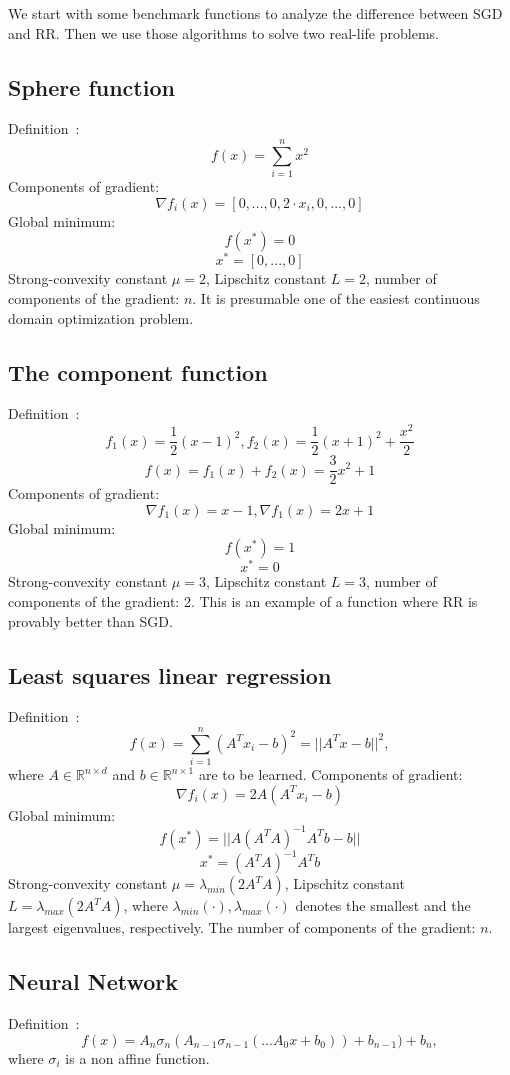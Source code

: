 \documentclass[10pt,conference,compsocconf]{IEEEtran}
\begin{document}
We start with some benchmark functions to analyze the difference between
SGD and RR. Then we use those algorithms to solve two real-life problems.

\subsection{Sphere function}

\noindent Definition~\cite{SPHERE}:
$$f(x) = \sum_{i=1}^n x^2$$
Components of gradient:
$$\nabla f_i(x) = [0,...,0,2\cdot x_i,0,...,0]$$
Global minimum:
$$f(x^*) = 0$$
$$x^* = [0,...,0]$$
Strong-convexity constant $\mu = 2$, Lipschitz constant \mbox{$L=2$},
number of components of the gradient: $n$. It is presumable one of
the easiest continuous domain optimization problem.

\subsection{The component function}
\noindent Definition~\cite{COMPONENTFUNCTION}:
$$f_1(x) = \frac{1}{2}(x-1)^2, f_2(x) = \frac{1}{2}(x+1)^2 + \frac{x^2}{2}$$
$$f(x) = f_1(x) + f_2(x) = \frac{3}{2} x^2 + 1$$
Components of gradient:
$$\nabla f_1(x) = x - 1, \nabla f_1(x) = 2x + 1$$
Global minimum:
$$f(x^*) = 1$$
$$x^* = 0$$
Strong-convexity constant $\mu = 3$, Lipschitz constant \mbox{$L=3$},
number of components of the gradient: 2. This is an example of a function where RR is provably better than SGD. \cite{COMPONENTFUNCTION}

\subsection{Least squares linear regression}

\noindent Definition~\cite{REGRESSION}:
$$f(x) = \sum_{i=1}^n (A^T x_i-b)^2 = ||A^T x-b||^2,$$
\noindent where $A \in \mathbb{R}^{n \times d}$ and $b \in \mathbb{R}^{n
\times 1}$ are to be learned.
Components of gradient:
$$\nabla f_i(x) = 2 A(A^T x_i - b)$$
Global minimum:
$$f(x^*) = ||A (A^T A)^{-1} A^T b - b||$$
$$x^* = (A^T A)^{-1} A^T b$$
Strong-convexity constant $\mu = \lambda_{min}(2A^TA)$, Lipschitz constant
\mbox{$L=\lambda_{max}(2A^TA)$}, where $\lambda_{min}(\cdot),
\lambda_{max}(\cdot)$ denotes the smallest and the largest
eigenvalues, respectively. The number of components of the gradient: $n$.

\subsection{Neural Network}
\noindent Definition~\cite{NEURALNETWORK}:
$$f(x) =  A_{n} \sigma_n(A_{n-1}\sigma_{n-1}(... A_0 x + b_0)) + b_{n-1}) + b_n,$$
\noindent where $\sigma_i$ is a non affine function. 
\end{document}
